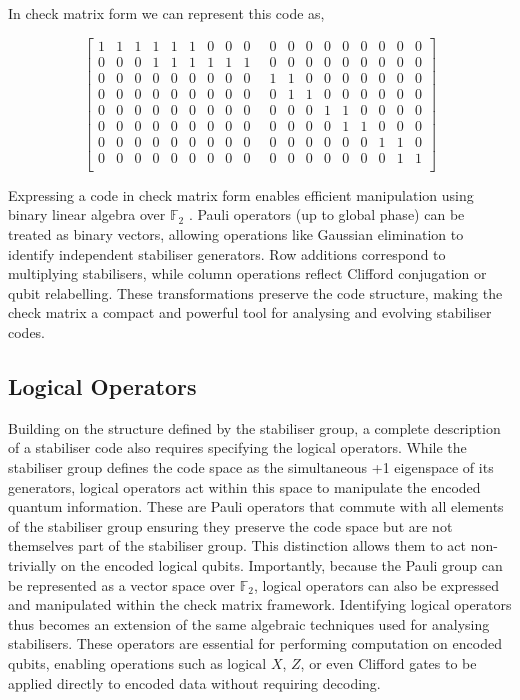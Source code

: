 In check matrix form we can represent this code as,

\begin{equation}
\label{eq:shor code check matrix}
\begin{bmatrix}
1 & 1 & 1 & 1 & 1 & 1 & 0 & 0 & 0 \; &\; 0 & 0 & 0 & 0 & 0 & 0 & 0 & 0 & 0 \\
0 & 0 & 0 & 1 & 1 & 1 & 1 & 1 & 1 \; &\; 0 & 0 & 0 & 0 & 0 & 0 & 0 & 0 & 0 \\
0 & 0 & 0 & 0 & 0 & 0 & 0 & 0 & 0 \; &\; 1 & 1 & 0 & 0 & 0 & 0 & 0 & 0 & 0 \\
0 & 0 & 0 & 0 & 0 & 0 & 0 & 0 & 0 \; &\; 0 & 1 & 1 & 0 & 0 & 0 & 0 & 0 & 0 \\
0 & 0 & 0 & 0 & 0 & 0 & 0 & 0 & 0 \; &\; 0 & 0 & 0 & 1 & 1 & 0 & 0 & 0 & 0 \\
0 & 0 & 0 & 0 & 0 & 0 & 0 & 0 & 0 \; &\; 0 & 0 & 0 & 0 & 1 & 1 & 0 & 0 & 0 \\
0 & 0 & 0 & 0 & 0 & 0 & 0 & 0 & 0 \; &\; 0 & 0 & 0 & 0 & 0 & 0 & 1 & 1 & 0 \\
0 & 0 & 0 & 0 & 0 & 0 & 0 & 0 & 0 \; &\; 0 & 0 & 0 & 0 & 0 & 0 & 0 & 1 & 1 \\
\end{bmatrix}
\end{equation}

Expressing a code in check matrix form enables efficient manipulation using binary linear algebra over \(\mathbb{F}_2\) \cite{webster2024engineeringquantumerrorcorrection}. Pauli operators (up to global phase) can be treated as binary vectors, allowing operations like Gaussian elimination to identify independent stabiliser generators. Row additions correspond to multiplying stabilisers, while column operations reflect Clifford conjugation or qubit relabelling. These transformations preserve the code structure, making the check matrix a compact and powerful tool for analysing and evolving stabiliser codes.

\subsection{Logical Operators}
Building on the structure defined by the stabiliser group, a complete description of a stabiliser code also requires specifying the logical operators. While the stabiliser group defines the code space as the simultaneous +1 eigenspace of its generators, logical operators act within this space to manipulate the encoded quantum information. These are Pauli operators that commute with all elements of the stabiliser group ensuring they preserve the code space but are not themselves part of the stabiliser group. This distinction allows them to act non-trivially on the encoded logical qubits. Importantly, because the Pauli group can be represented as a vector space over \( \mathbb{F}_2 \), logical operators can also be expressed and manipulated within the check matrix framework. Identifying logical operators thus becomes an extension of the same algebraic techniques used for analysing stabilisers. These operators are essential for performing computation on encoded qubits, enabling operations such as logical \(X\), \(Z\), or even Clifford gates to be applied directly to encoded data without requiring decoding.

